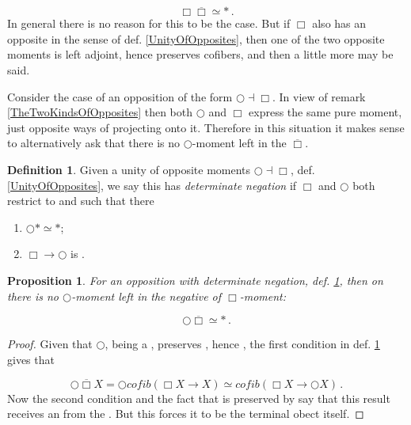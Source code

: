 \documentclass[12pt,titlepage]{article}
\theoremstyle{plain}
\newtheorem{prop}{Proposition}
\theoremstyle{definition}
\newtheorem{defn}{Definition}
\theoremstyle{remark}
\begin{document}
\begin{displaymath}
\Box \overline{\Box} \simeq \ast
  \,.
\end{displaymath}
In general there is no reason for this to be the case. But if $\Box$ also has an opposite in the sense of def. \ref{UnityOfOpposites}, then one of the two opposite moments is left adjoint, hence preserves cofibers, and then a little more may be said.

Consider the case of an opposition of the form $\bigcirc \dashv \Box$. In view of remark \ref{TheTwoKindsOfOpposites} then both $\bigcirc$ and $\Box$ express the same pure moment, just opposite ways of projecting onto it. Therefore in this situation it makes sense to alternatively ask that there is no $\bigcirc$-moment left in the $\overline{\Box}$.

\begin{defn}
\label{CompleteOpposition}\hypertarget{CompleteOpposition}{}
Given a unity of opposite moments $\bigcirc \dashv \Box$, def. \ref{UnityOfOpposites}, we say this has \emph{determinate negation} if $\Box$ and $\bigcirc$ both restrict to  and such that there

\begin{enumerate}%
\item $\bigcirc \ast \simeq \ast$;


\item $\Box  \longrightarrow \bigcirc$ is .



\end{enumerate}
\end{defn}
\begin{prop}
\label{AccuracyOfNegatives}\hypertarget{AccuracyOfNegatives}{}
For an opposition with determinate negation, def. \ref{CompleteOpposition}, then on  there is no $\bigcirc$-moment left in the negative of $\Box$-moment:

\begin{displaymath}
\bigcirc \overline{\Box} \simeq \ast
  \,.
\end{displaymath}
\end{prop}
\begin{proof}
Given that $\bigcirc$, being a , preserves , hence , the first condition in def. \ref{CompleteOpposition} gives that

\begin{displaymath}
\bigcirc \overline{\Box} X
  =
  \bigcirc cofib(\Box X \to X)
  \simeq
  cofib(\Box X \to \bigcirc X)
  \,.
\end{displaymath}
Now the second condition and the fact that  is preserved by  say that this result receives an  from the . But this forces it to be the terminal obect itself.

\end{proof}
\end{document}
